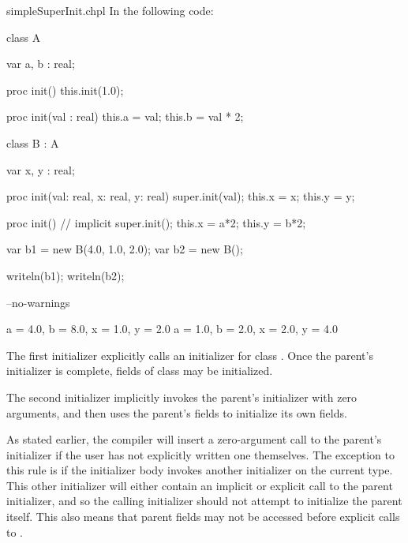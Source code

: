 \begin{chapelexample}{simpleSuperInit.chpl}
In the following code:
\begin{chapel}
class A {
  var a, b : real;

  proc init() {
    this.init(1.0);
  }

  proc init(val : real) {
    this.a = val;
    this.b = val * 2;
  }
}

class B : A {
  var x, y : real;

  proc init(val: real, x: real, y: real) {
    super.init(val);
    this.x = x;
    this.y = y;
  }

  proc init() {
    // implicit super.init();
    this.x = a*2;
    this.y = b*2;
  }
}

var b1 = new B(4.0, 1.0, 2.0);
var b2 = new B();
\end{chapel}
\begin{chapelpost}
writeln(b1);
writeln(b2);
\end{chapelpost}
\begin{chapelcompopts}
--no-warnings
\end{chapelcompopts}
\begin{chapeloutput}
{a = 4.0, b = 8.0, x = 1.0, y = 2.0}
{a = 1.0, b = 2.0, x = 2.0, y = 4.0}
\end{chapeloutput}
The first initializer explicitly calls an initializer for class . Once
the parent's initializer is complete, fields of class  may be
initialized.

The second initializer implicitly invokes the parent's initializer with zero
arguments, and then uses the parent's fields to initialize its own fields.
\end{chapelexample}

As stated earlier, the compiler will insert a zero-argument call to the
parent's initializer if the user has not explicitly written one themselves.
The exception to this rule is if the initializer body invokes another
initializer on the current type. This other initializer will either contain an
implicit or explicit call to the parent initializer, and so the calling
initializer should not attempt to initialize the parent itself. This also means
that parent fields may not be accessed before explicit calls to .

